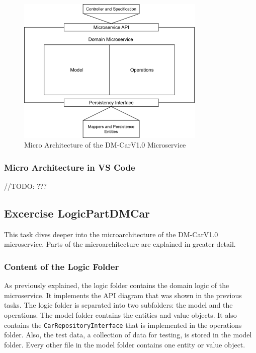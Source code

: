 \begin{figure}
    \centering
    \includegraphics[width=0.8\textwidth]{figures/microservices/dmCar/ms_dmCar_microArchitecture.png}
    \caption{Micro Architecture of the DM-CarV1.0 Microservice}
    \label{fig:ms_dmCar_microArchitecture}
\end{figure}

\subsubsection*{Micro Architecture in VS Code}
//TODO: ???


\subsection{Excercise LogicPartDMCar}
This task dives deeper into the microarchitecture of the DM-CarV1.0 microservice.
Parts of the microarchitecture are explained in greater detail.

\subsubsection*{Content of the Logic Folder}
As previously explained, the logic folder contains the domain logic of the microservice.
It implements the API diagram that was shown in the previous tasks.
The logic folder is separated into two subfolders: the model and the operations.
The model folder contains the entities and value objects.
It also contains the \texttt{CarRepositoryInterface} that is implemented in the operations folder.
Also, the test data, a collection of data for testing, is stored in the model folder.
Every other file in the model folder contains one entity or value object.

